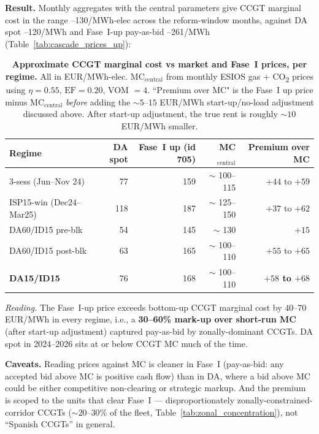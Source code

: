 \documentclass[11pt,a4paper]{article}
\begin{document}
\textbf{Result.} Monthly aggregates with the central parameters give CCGT marginal cost in the range --130/MWh-elec across the reform-window months, against DA spot --120/MWh and Fase~I-up pay-as-bid --261/MWh (Table~\ref{tab:cascade_prices_up}):

\begin{table}[H]
\centering\scriptsize
\caption{\textbf{Approximate CCGT marginal cost vs market and Fase~I prices, per regime.} All in EUR/MWh-elec. MC$_{\text{central}}$ from monthly ESIOS gas + CO\textsubscript{2} prices using $\eta = 0.55$, $\mathrm{EF} = 0.20$, VOM $= 4$. ``Premium over MC" is the Fase~I up price minus MC$_{\text{central}}$ \emph{before} adding the $\sim 5$--$15$ EUR/MWh start-up/no-load adjustment discussed above. After start-up adjustment, the true rent is roughly $\sim 10$ EUR/MWh smaller.}
\label{tab:mc_ccgt_premium}
\setlength{\tabcolsep}{5pt}
\begin{tabular}{l r r r r}
\toprule
Regime & DA spot & Fase~I up (id 705) & MC$_{\text{central}}$ & Premium over MC \\
\midrule
3-sess (Jun--Nov 24) & 77 & 159 & $\sim$ 100--115 & $+44$ to $+59$ \\
ISP15-win (Dec24--Mar25) & 118 & 187 & $\sim$ 125--150 & $+37$ to $+62$ \\
DA60/ID15 pre-blk & 54 & 145 & $\sim$ 130 & $+15$ \\
DA60/ID15 post-blk & 63 & 165 & $\sim$ 100--110 & $+55$ to $+65$ \\
\textbf{DA15/ID15} & 76 & 168 & $\sim$ 100--110 & \textbf{$+58$ to $+68$} \\
\bottomrule
\end{tabular}
\end{table}

\textit{Reading.} The Fase~I-up price exceeds bottom-up CCGT marginal cost by 40--70 EUR/MWh in every regime, i.e., a \textbf{30--60\% mark-up over short-run MC} (after start-up adjustment) captured pay-as-bid by zonally-dominant CCGTs. DA spot in 2024--2026 sits at or below CCGT MC much of the time.

\textbf{Caveats.} Reading prices against MC is cleaner in Fase~I (pay-as-bid: any accepted bid above MC is positive cash flow) than in DA, where a bid above MC could be either competitive non-clearing or strategic markup. And the premium is scoped to the units that clear Fase~I --- disproportionately zonally-constrained-corridor CCGTs ($\sim 20$--$30\%$ of the fleet, Table~\ref{tab:zonal_concentration}), not ``Spanish CCGTs'' in general.
\end{document}
